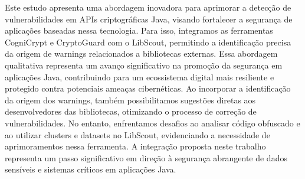 Este estudo apresenta uma abordagem inovadora para aprimorar a detecção de vulnerabilidades em APIs
criptográficas Java, visando fortalecer a segurança de aplicações baseadas nessa tecnologia. 
Para isso, integramos as ferramentas CogniCrypt e CryptoGuard com o LibScout, permitindo a 
identificação precisa da origem de warnings relacionados a bibliotecas externas. 
Essa abordagem qualitativa representa um avanço significativo na promoção da segurança em aplicações Java,
contribuindo para um ecossistema digital mais resiliente e protegido contra potenciais 
ameaças cibernéticas. Ao incorporar a identificação da origem dos warnings, também possibilitamos 
sugestões diretas aos desenvolvedores das bibliotecas, otimizando o processo de correção de 
vulnerabilidades. No entanto, enfrentamos desafios ao analisar código obfuscado e ao utilizar 
clusters e datasets no LibScout, evidenciando a necessidade de aprimoramentos nessa ferramenta. 
A integração proposta neste trabalho representa um passo significativo em direção à segurança 
abrangente de dados sensíveis e sistemas críticos em aplicações Java.